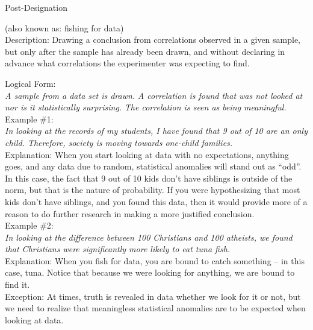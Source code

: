\documentclass[a4paper,12pt,single,pdftex]{scrartcl}
\begin{document}
    
  

Post-Designation
    
      (also known as: fishing for data)
    \\

  
    Description: Drawing a conclusion from correlations observed in a given sample, but only after the sample has already been drawn, and without declaring in advance what correlations the experimenter was expecting to find.

    
      Logical Form:
    \\

    
      {\em A sample from a data set is drawn.} \newline
{\em A correlation is found that was not looked at nor is it statistically surprising.} \newline
{\em The correlation is seen as being meaningful.}
    \\

    
      Example \#1:
    \\

    
      {\em In looking at the records of my students, I have found that 9 out of 10 are an only child.  Therefore, society is moving towards one-child families.}
    \\

    
      Explanation: When you start looking at data with no expectations, anything goes, and any data due to random, statistical anomalies will stand out as “odd”.  In this case, the fact that 9 out of 10 kids don’t have siblings is outside of the norm, but that is the nature of probability.  If you were hypothesizing that most kids don’t have siblings, and you found this data, then it would provide more of a reason to do further research in making a more justified conclusion. 
    \\

    
      Example \#2:
    \\

    
      {\em In looking at the difference between 100 Christians and 100 atheists, we found that Christians were significantly more likely to eat tuna fish.}
    \\

    
      Explanation: When you fish for data, you are bound to catch something -- in this case, tuna.  Notice that because we were looking for anything, we are bound to find it.
    \\

    
      Exception: At times, truth is revealed in data whether we look for it or not, but we need to realize that meaningless statistical anomalies are to be expected when looking at data.
    \\
\end{document}
